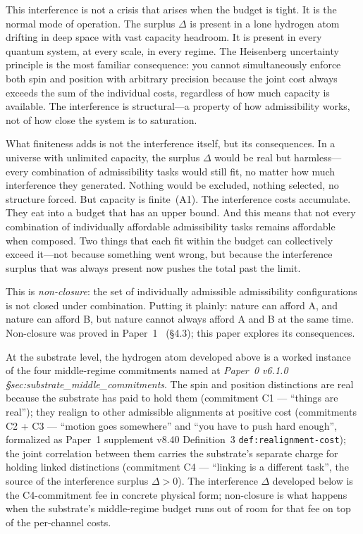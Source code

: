 \documentclass[11pt]{article}
\begin{document}
This interference is not a crisis that arises when the budget is tight.  It is the normal mode of operation.  The surplus $\Delta$ is present in a lone hydrogen atom drifting in deep space with vast capacity headroom.  It is present in every quantum system, at every scale, in every regime.  The Heisenberg uncertainty principle is the most familiar consequence: you cannot simultaneously enforce both spin and position with arbitrary precision because the joint cost always exceeds the sum of the individual costs, regardless of how much capacity is available.  The interference is structural---a property of how admissibility works, not of how close the system is to saturation.

What finiteness adds is not the interference itself, but its consequences.  In a universe with unlimited capacity, the surplus $\Delta$ would be real but harmless---every combination of admissibility tasks would still fit, no matter how much interference they generated.  Nothing would be excluded, nothing selected, no structure forced.  But capacity is finite~(A1).  The interference costs accumulate.  They eat into a budget that has an upper bound.  And this means that not every combination of individually affordable admissibility tasks remains affordable when composed.  Two things that each fit within the budget can collectively exceed it---not because something went wrong, but because the interference surplus that was always present now pushes the total past the limit.

This is \emph{non-closure}: the set of individually admissible admissibility configurations is not closed under combination.  Putting it plainly: nature can afford A, and nature can afford B, but nature cannot always afford A and B at the same time.  Non-closure was proved in Paper~1~\cite{BrookePaper1} (\S4.3); this paper explores its consequences.

At the substrate level, the hydrogen atom developed above is a worked instance of the four middle-regime commitments named at \emph{Paper~0 v6.1.0 \S sec:substrate\_middle\_commitments}. The spin and position distinctions are real because the substrate has paid to hold them (commitment C1 --- ``things are real''); they realign to other admissible alignments at positive cost (commitments C2 + C3 --- ``motion goes somewhere'' and ``you have to push hard enough'', formalized as Paper~1 supplement v8.40 Definition~3 \texttt{def:realignment-cost}); the joint correlation between them carries the substrate's separate charge for holding linked distinctions (commitment C4 --- ``linking is a different task'', the source of the interference surplus $\Delta > 0$). The interference $\Delta$ developed below is the C4-commitment fee in concrete physical form; non-closure is what happens when the substrate's middle-regime budget runs out of room for that fee on top of the per-channel costs.
\end{document}
